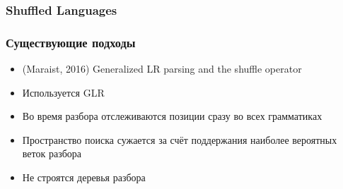 \documentclass{beamer}
\begin{document}
\begin{frame}
     \frametitle{Shuffled Languages}
     
 \end{frame}
 
 \begin{frame}
     \frametitle{Существующие подходы}
         \begin{itemize}
             \item (Maraist, 2016) Generalized LR parsing and the shuffle operator 
             \item Используется GLR
             \item Во время разбора отслеживаются позиции сразу во всех грамматиках
             \item Пространство поиска сужается за счёт поддержания наиболее вероятных веток разбора
             \item Не строятся деревья разбора
         \end{itemize}
 \end{frame}
 
\end{document}
